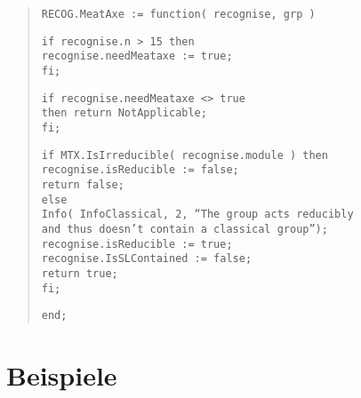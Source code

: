\documentclass[a4paper,11pt]{article}
\theoremstyle{bla}
\begin{document}
\begin{quote}
\hspace*{-0.3cm} \texttt{RECOG.MeatAxe := function( recognise, grp )}

  \texttt{if recognise.n > 15 then}\\
    \hspace*{0.3cm} \texttt{recognise.needMeataxe := true;}\\
  \texttt{fi;}

  \texttt{if recognise.needMeataxe <> true}\\
    \hspace*{0.3cm} \texttt{then return NotApplicable;}\\
  \texttt{fi;}

  \texttt{if MTX.IsIrreducible( recognise.module ) then}\\
     \hspace*{0.3cm} \texttt{recognise.isReducible := false;}\\
     \hspace*{0.3cm} \texttt{return false;}\\
  \texttt{else}\\
     \hspace*{0.3cm} \texttt{Info( InfoClassical, 2, ``The group acts reducibly}\\
     \hspace*{0.3cm} \texttt{and thus doesn't contain a classical group'');}\\
     \hspace*{0.3cm} \texttt{recognise.isReducible := true;}\\
     \hspace*{0.3cm} \texttt{recognise.IsSLContained := false;}\\
     \hspace*{0.3cm} \texttt{return true;}\\
  \texttt{fi;}

\hspace*{-0.3cm} \texttt{end;}
\end{quote}


\section{Beispiele}\label{bsp}
\end{document}

